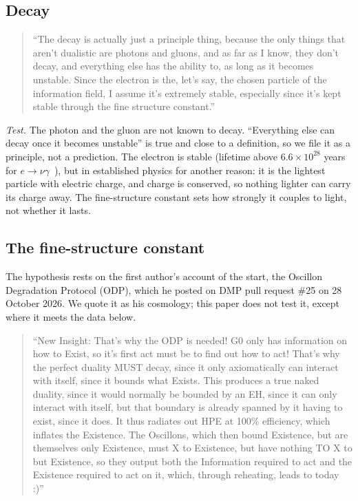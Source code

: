 \documentclass[11pt,a4paper]{article}
\theoremstyle{definition}
\theoremstyle{remark}
\begin{document}
\subsection{Decay}

\begin{quote}
``The decay is actually just a principle thing, because the only things that aren't dualistic are photons and gluons, and as far as I
know, they don't decay, and everything else has the ability to, as long as it becomes unstable. Since the electron is the, let's say, the
chosen particle of the information field, I assume it's extremely stable, especially since it's kept stable through the fine structure
constant.''
\end{quote}

\noindent\emph{Test.} The photon and the gluon are not known to decay. ``Everything else can decay once it becomes unstable'' is true and
close to a definition, so we file it as a principle, not a prediction. The electron is stable (lifetime above $6.6\times10^{28}$ years
for $e\to\nu\gamma$~\cite{borexino}), but in established physics for another reason: it is the lightest particle with electric charge,
and charge is conserved, so nothing lighter can carry its charge away. The fine-structure constant sets how strongly it couples to light,
not whether it lasts.

\subsection{The fine-structure constant}

\noindent The hypothesis rests on the first author's account of the start, the Oscillon Degradation Protocol (ODP), which he posted on
DMP pull request \#25 on 28 October 2026. We quote it as his cosmology; this paper does not test it, except where it meets the data
below.

\begin{quote}
``New Insight: That's why the ODP is needed! G0 only has information on how to Exist, so it's first act must be to find out how to act!
That's why the perfect duality MUST decay, since it only axiomatically can interact with itself, since it bounds what Exists. This
produces a true naked duality, since it would normally be bounded by an EH, since it can only interact with itself, but that boundary is
already spanned by it having to exist, since it does. It thus radiates out HPE at 100\% efficiency, which inflates the Existence. The
Oscillons, which then bound Existence, but are themselves only Existence, must X to Existence, but have nothing TO X to but Existence, so
they output both the Information required to act and the Existence required to act on it, which, through reheating, leads to today :)''
\end{quote}
\end{document}

